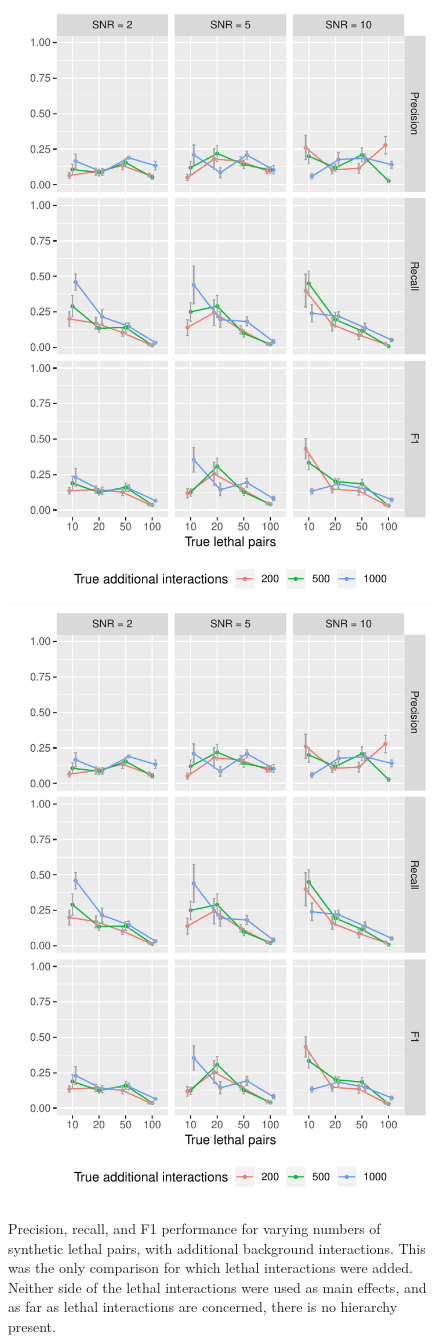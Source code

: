 \begin{figure}
\begin{minipage}{\linewidth}
	\centering
	\includegraphics[width=0.5\linewidth]{"output/PrecRecF1_n10000_tno_large0_lethalTRUE_lethal"}%
	\includegraphics[width=0.5\linewidth]{"output/PrecRecF1_n10000_tno_large0_lethalTRUE_lethal"}
\end{minipage}
\caption{Precision, recall, and F1 performance for varying numbers of synthetic lethal pairs, with additional background interactions. This was the only comparison for which lethal interactions were added. Neither side of the lethal interactions were used as main effects, and as far as lethal interactions are concerned, there is no hierarchy present.}
\end{figure}


